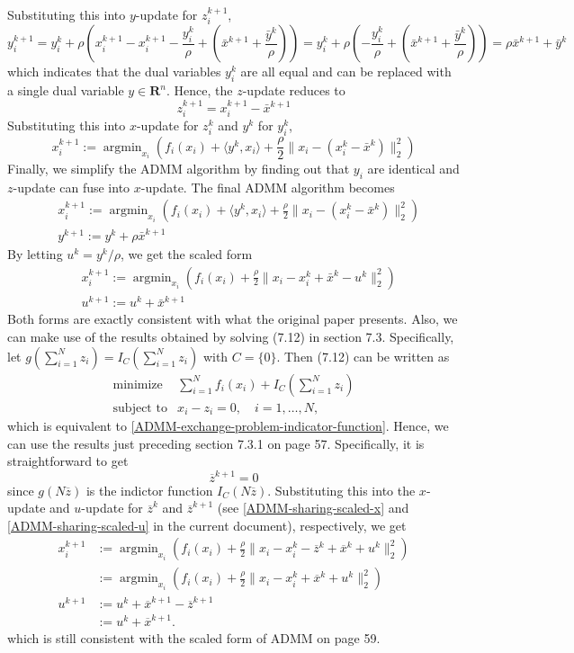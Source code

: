 \documentclass{article}
\theoremstyle{remark}
\newcommand{\argmin}{\mathop{\mathrm{argmin}}}
\newcommand{\st}{\mathop{\mathrm{subject\,\,to}}}
\def\R{\mathbf{R}}
\begin{document}
Substituting this into $y$-update for $z_i^{k+1}$,
\begin{dmath*}
y_i^{k+1}=y_i^k+\rho\left(x_i^{k+1}-x_i^{k+1}-\frac{y_i^k}{\rho}+(\bar{x}^{k+1}+\frac{\bar{y}^k}{\rho})\right)
=y_i^k+\rho\left(-\frac{y_i^k}{\rho}+(\bar{x}^{k+1}+\frac{\bar{y}^k}{\rho})\right)
=\rho\bar{x}^{k+1}+\bar{y}^k
\end{dmath*}
which indicates that the dual variables $y_i^k$ are all equal and can be replaced with a single dual variable $y\in\R^n$. Hence, the $z$-update reduces to
\[
z_i^{k+1}=x_i^{k+1}-\bar{x}^{k+1}
\]
Substituting this into $x$-update for $z_i^k$ and $y^k$ for $y_i^k$,
\[
x_i^{k+1}:=\argmin_{x_i}\left( f_i(x_i) + \langle y^k, x_i\rangle + \frac{\rho}{2}\|x_i-(x_i^{k}-\bar{x}^{k})\|_2^2\right)
\]
Finally, we simplify the ADMM algorithm by finding out that $y_i$ are identical and $z$-update can fuse into $x$-update. The final ADMM algorithm becomes
\begin{align*}
 & x_i^{k+1}:=\argmin_{x_i}\left( f_i(x_i) + \langle y^k, x_i\rangle + \frac{\rho}{2}\|x_i-(x_i^{k}-\bar{x}^{k})\|_2^2\right) \\
 & y^{k+1}:=y^k+\rho\bar{x}^{k+1}
\end{align*}
By letting $u^k=y^k/\rho$, we get the scaled form
\begin{align*}
 & x_i^{k+1}:=\argmin_{x_i}\left( f_i(x_i) + \frac{\rho}{2}\|x_i-x_i^{k}+\bar{x}^{k}-u^k\|_2^2\right) \\
 & u^{k+1}:=u^k+\bar{x}^{k+1}
\end{align*}
Both forms are exactly consistent with what the original paper presents. Also, we can make use of the results obtained by solving (7.12) in section 7.3. Specifically, let $g(\sum_{i=1}^{N}z_i)=I_C(\sum_{i=1}^{N}z_i)$ with $C=\{0\}$. Then (7.12) can be written as
\begin{equation}
\begin{array}{ll}
\operatorname{minimize}& \sum_{i=1}^{N} f_i(x_i) + I_C(\sum_{i=1}^{N}z_i)\\
\st & x_i-z_i=0,\quad i=1,\ldots,N,
\end{array}
\end{equation}
which is equivalent to \eqref{ADMM-exchange-problem-indicator-function}. Hence, we can use the results just preceding section 7.3.1 on page 57. Specifically, it is straightforward to get
\[
\overline{z}^{k+1}=0
\]
since $g(N\overline{z})$ is the indictor function $I_C(N\overline{z})$. Substituting this into the $x$-update and $u$-update for $\overline{z}^{k}$ and $\overline{z}^{k+1}$ (see \eqref{ADMM-sharing-scaled-x} and \eqref{ADMM-sharing-scaled-u} in the current document), respectively, we get
\begin{align*}
x_i^{k+1}&:=\argmin_{x_i} \left( f_i(x_i)+\frac{\rho}{2}\|x_i-x_i^{k}-\overline{z}^{k}+\overline{x}^{k}+u^k\|_2^2\right) \\
&:=\argmin_{x_i} \left( f_i(x_i)+\frac{\rho}{2}\|x_i-x_i^{k}+\overline{x}^{k}+u^k\|_2^2\right)\\
u^{k+1}&:=u^k+\overline{x}^{k+1}-\overline{z}^{k+1}\\
&:=u^k+\overline{x}^{k+1}.
\end{align*}
which is still consistent with the scaled form of ADMM on page 59.
\end{document}
